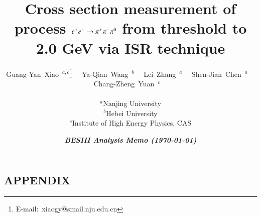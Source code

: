 \documentclass[12pt,a4paper]{besnote}
\title{Cross section measurement of process $e^+e^-\rightarrow\pi^+\pi^-\pi^{0}$ from threshold to 2.0 GeV via ISR technique}
\author{
    Guang-Yan~Xiao~$^{a,c}$\footnote{E-mail:~{xiaogy@smail.nju.edu.cn}}~~
    Ya-Qian~Wang~$^{b}$~~
    Lei~Zhang~$^{a}$~~
    Shen-Jian~Chen~$^{a}$~~
    Chang-Zheng~Yuan~$^{c}$~~
    \\~\\
    $^a$Nanjing University\\
    $^b$Hebei University\\
    $^c$Institute of High Energy Physics, CAS\\
}
\date{\it \small \bf BESIII Analysis Memo (\today) }
\begin{document}


\clearpage
\tableofcontents
\clearpage

\setrunninglinenumbers
\begin{linenumbers}

    
    
    
    
    
    
    
    
    

    \clearpage
    

    \newpage
    \appendix
    \section*{APPENDIX}  %
    \clearpage
\end{linenumbers}
\end{document}

